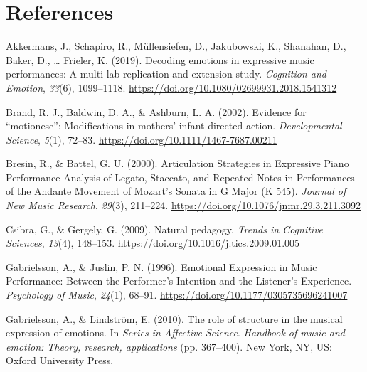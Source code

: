 \documentclass[
  man,floatsintext]{apa6}
\newlength{\cslhangindent}
\newlength{\cslentryspacingunit} %
\newenvironment{CSLReferences}[2] %
 {%
  \setlength{\parindent}{0pt}
  \ifodd #1
  \let\oldpar\par
  \def\par{\hangindent=\cslhangindent\oldpar}
  \fi
  \setlength{\parskip}{#2\cslentryspacingunit}
 }%
 {}
\begin{document}
\newpage

\hypertarget{references}{%
\section{References}\label{references}}

\begingroup
\setlength{\parindent}{-0in}
\setlength{\leftskip}{0in}

\hypertarget{refs}{}
\begin{CSLReferences}{1}{0}
\leavevmode{}%
Akkermans, J., Schapiro, R., Müllensiefen, D., Jakubowski, K., Shanahan, D., Baker, D., \ldots{} Frieler, K. (2019). Decoding emotions in expressive music performances: {A} multi-lab replication and extension study. \emph{Cognition and Emotion}, \emph{33}(6), 1099--1118. \url{https://doi.org/10.1080/02699931.2018.1541312}

\leavevmode{}%
Brand, R. J., Baldwin, D. A., \& Ashburn, L. A. (2002). Evidence for {``motionese''}: Modifications in mothers' infant-directed action. \emph{Developmental Science}, \emph{5}(1), 72--83. \url{https://doi.org/10.1111/1467-7687.00211}

\leavevmode{}%
Bresin, R., \& Battel, G. U. (2000). Articulation {Strategies} in {Expressive Piano Performance Analysis} of {Legato}, {Staccato}, and {Repeated Notes} in {Performances} of the {Andante Movement} of {Mozart}'s {Sonata} in {G Major} ({K} 545). \emph{Journal of New Music Research}, \emph{29}(3), 211--224. \url{https://doi.org/10.1076/jnmr.29.3.211.3092}

\leavevmode{}%
Csibra, G., \& Gergely, G. (2009). Natural pedagogy. \emph{Trends in Cognitive Sciences}, \emph{13}(4), 148--153. \url{https://doi.org/10.1016/j.tics.2009.01.005}

\leavevmode{}%
Gabrielsson, A., \& Juslin, P. N. (1996). Emotional {Expression} in {Music Performance}: {Between} the {Performer}'s {Intention} and the {Listener}'s {Experience}. \emph{Psychology of Music}, \emph{24}(1), 68--91. \url{https://doi.org/10.1177/0305735696241007}

\leavevmode{}%
Gabrielsson, A., \& Lindström, E. (2010). The role of structure in the musical expression of emotions. In \emph{Series in Affective Science}. \emph{Handbook of music and emotion: {Theory}, research, applications} (pp. 367--400). {New York, NY, US}: {Oxford University Press}.


\end{CSLReferences}
\end{document}
